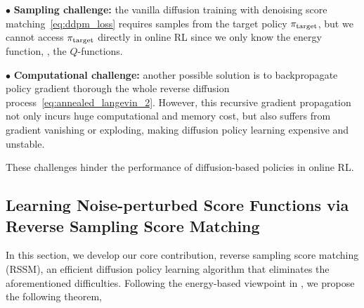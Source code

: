 $\bullet$ \textbf{Sampling challenge:} the vanilla diffusion training with denoising score matching~\eqref{eq:ddpm_loss} requires samples from the target policy $\pi_{\rm target}$, but we cannot access $\pi_{\rm target}$ directly in online RL since we only know the energy function, \ie, the $Q$-functions.

$\bullet$ \textbf{Computational challenge:} another possible solution is to backpropagate policy gradient thorough the whole reverse diffusion process~\eqref{eq:annealed_langevin_2}. However, this recursive gradient propagation not only incurs huge computational and memory cost, but also suffers from gradient vanishing or exploding, making diffusion policy learning expensive and unstable.

These challenges hinder the performance of diffusion-based policies in online RL. 












\subsection{Learning Noise-perturbed Score Functions via Reverse Sampling Score Matching }
\label{subsec:main_theorem}




In this section, we develop our core contribution, reverse sampling score matching (RSSM), an efficient diffusion policy learning algorithm that eliminates the aforementioned difficulties. 
Following the energy-based viewpoint in , we propose the following theorem,


